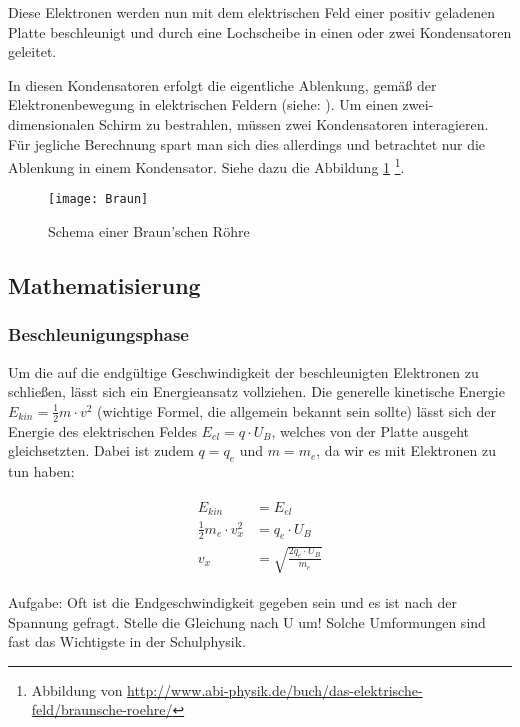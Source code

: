 Diese Elektronen werden nun mit dem elektrischen Feld einer positiv geladenen Platte beschleunigt und durch eine Lochscheibe in einen oder zwei Kondensatoren geleitet.

In diesen Kondensatoren erfolgt die eigentliche Ablenkung, gemäß der Elektronenbewegung in elektrischen Feldern (siehe: ). Um einen zwei-dimensionalen Schirm zu bestrahlen, müssen zwei Kondensatoren interagieren. Für jegliche Berechnung spart man sich dies allerdings und betrachtet nur die Ablenkung in einem Kondensator. Siehe dazu die Abbildung \ref{fig:BraunscheRoehre} \footnote{Abbildung von \url{http://www.abi-physik.de/buch/das-elektrische-feld/braunsche-roehre/}}.

\begin{figure}[h!] 
	\centering
	\texttt{[image: Braun]}
	\caption{Schema einer Braun'schen Röhre}
	\label{fig:BraunscheRoehre}
\end{figure}

\subsection{Mathematisierung}

\subsubsection{Beschleunigungsphase}

Um die auf die endgültige Geschwindigkeit der beschleunigten Elektronen zu schließen, lässt sich ein Energieansatz vollziehen. Die generelle kinetische Energie $E_{kin}=\frac{1}{2}m \cdot v^2$ (wichtige Formel, die allgemein bekannt sein sollte) lässt sich der Energie des elektrischen Feldes $E_{el}=q \cdot U_B$, welches von der Platte ausgeht gleichsetzten. Dabei ist zudem $q = q_e$ und $m = m_e$, da wir es mit Elektronen zu tun haben:

\begin{align} \label{eq:BeschleunigungNachV}
\begin{split}
	E_{kin} &= E_{el} \\
	\frac{1}{2}m_e \cdot v_{x}^2 &= q_e \cdot U_B \\
	v_x &= \sqrt{\frac{2q_e \cdot U_B}{m_e}}
\end{split}
\end{align}

\begin{leftbar}
Aufgabe: Oft ist die Endgeschwindigkeit gegeben sein und es ist nach der Spannung gefragt. Stelle die Gleichung nach U um! Solche Umformungen sind fast das Wichtigste in der Schulphysik.
\end{leftbar}

